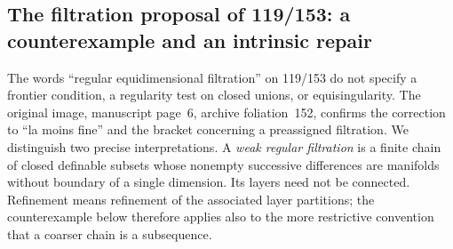 \subsection{The filtration proposal of 119/153: a counterexample and an intrinsic repair}

The words ``regular equidimensional filtration'' on 119/153 do not
specify a frontier condition, a regularity test on closed unions, or
equisingularity. The original image, manuscript page~6, archive
foliation~152, confirms the correction to ``la moins fine'' and the
bracket concerning a preassigned filtration. We distinguish two precise
interpretations. A \emph{weak regular filtration} is a finite chain of
closed definable subsets whose nonempty successive differences are
manifolds without boundary of a single dimension. Its layers need not be
connected. Refinement means refinement of the associated layer
partitions; the counterexample below therefore applies also to the
more restrictive convention that a coarser chain is a subsequence.

